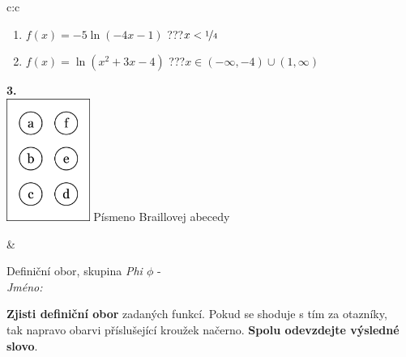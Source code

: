 \documentclass[10pt]{report}
\begin{document}
\begin{tabular}{c:c}
\begin{minipage}[c][104.5mm][t]{0.5\linewidth}
\begin{center}
\begin{minipage}{0.79\linewidth}
\begin{center}
\begin{varwidth}{\linewidth}
\begin{enumerate}
\item $f(x)=-5\ln{(-4x-1)}$\quad \dotfill\; ???\;\dotfill \quad $x<\nicefrac{1}{4}$
\item $f(x)=\ln{(x^2+3x-4)}$\quad \dotfill\; ???\;\dotfill \quad $x\in(-\infty , -4)\cup(1 , \infty)$
\end{enumerate}
\end{varwidth}
\end{center}
\end{minipage}
\begin{minipage}{0.20\linewidth}
\begin{center}
{\Huge\bfseries 3.} \\[2mm]
\includegraphics[height=40mm]{../images/braille.png}
{\small Písmeno Braillovej abecedy}
\end{center}
\end{minipage}
\end{center}
\end{minipage}
&
\begin{minipage}[c][104.5mm][t]{0.5\linewidth}
\begin{center}
\vspace{7mm}
{\huge Definiční obor, skupina \textit{Phi $\phi$} -}\\[5mm]
\textit{Jméno:}\phantom{xxxxxxxxxxxxxxxxxxxxxxxxxxxxxxxxxxxxxxxxxxxxxxxxxxxxxxxxxxxxxxxxx}\\[5mm]
\begin{minipage}{0.95\linewidth}
\begin{center}
\textbf{Zjisti definiční obor} zadaných funkcí. Pokud se shoduje s tím za otazníky,\\tak napravo obarvi příslušející kroužek načerno. \textbf{Spolu odevzdejte výsledné slovo}.
\end{center}
\end{minipage}
\\[1mm]
\begin{minipage}{0.79\linewidth}
\begin{center}
\begin{varwidth}{\linewidth}
\begin{enumerate}

\end{enumerate}
\end{varwidth}
\end{center}
\end{minipage}
\end{center}
\end{minipage}
\end{tabular}
\end{document}
